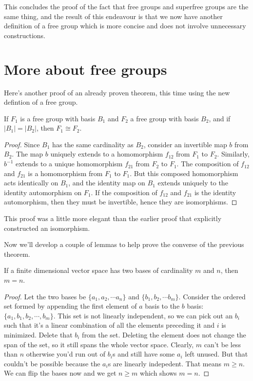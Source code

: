 This concludes the proof of the fact that free groups and superfree groups are the same thing, and the result of this endeavour is that we now have another definition of a free group which is more concise and does not involve unnecessary constructions.

\section{More about free groups}

Here's another proof of an already proven theorem, this time using the new defintion of a free group.

\begin{thm}
If $F_1$ is a free group with basis $B_1$ and $F_2$ a free group with basis $B_2$, and if $|B_1|=|B_2|$, then $F_1 \cong F_2$.
\end{thm}

\begin{proof}
Since $B_1$ has the same cardinality as $B_2$, consider an invertible map $b$ from $B_2$. The map $b$ uniquely extends to a homomorphism $f_{12}$ from $F_1$ to $F_2$. Similarly, $b^{-1}$ extends to a unique homomorphism $f_{21}$ from $F_2$ to $F_1$. The composition of $f_{12}$ and $f_{21}$ is a homomorphism from $F_1$ to $F_1$. But this composed homomorphism acts identically on $B_1$, and the identity map on $B_1$ extends uniquely to the identity automorphism on $F_1$. If the composition of $f_{12}$ and $f_{21}$ is the identity automorphism, then they must be invertible, hence they are isomorphisms.
\end{proof}
This proof was a little more elegant than the earlier proof that explicitly constructed an isomorphism.

Now we'll develop a couple of lemmas to help prove the converse of the previous theorem.

\begin{lem}\label{basis}\cite{halmos}
If a finite dimensional vector space has two bases of cardinality $m$ and $n$, then $m=n$.
\end{lem}

\begin{proof}
Let the two bases be $\{a_1, a_2 ,\cdots a_n\}$ and $\{b_1, b_2, \cdots b_m\}$. Consider the ordered set formed by appending the first element of $a$ basis to the $b$ basis: $\{a_1, b_1, b_2, \cdots, b_m\}$. This set is not linearly independent, so we can pick out an $b_i$ such that it's a linear combination of all the elements preceding it and $i$ is minimized. Delete that $b_i$ from the set. Deleting the element does not change the span of the set, so it still spans the whole vector space. Clearly, $m$ can't be less than $n$ otherwise you'd run out of $b_i$s and still have some $a_i$ left unused. But that couldn't be possible because the $a_i$s are linearly indepedent. That means $m \geq n$. We can flip the bases now and we get $n \geq m$ which shows $m=n$.
\end{proof}

